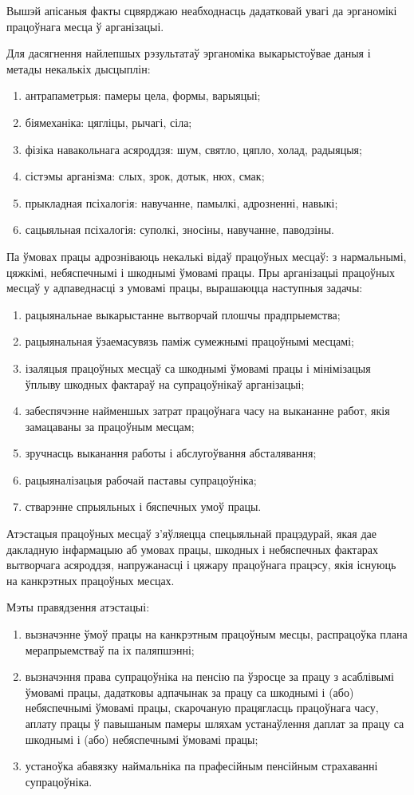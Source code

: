 Вышэй апісаныя факты сцвярджаю неабходнасць дадатковай увагі да эрганомікі
працоўнага месца ў арганізацыі.

Для дасягнення найлепшых рэзультатаў эрганоміка выкарыстоўвае даныя і метады некалькіх дысцыплін:
\begin{enumerate}
    \item антрапаметрыя: памеры цела, формы, варыяцыі;
    \item біямеханіка: цягліцы, рычагі, сіла;
    \item фізіка навакольнага асяроддзя: шум, святло, цяпло, холад, радыяцыя;
    \item сістэмы арганізма: слых, зрок, дотык, нюх, смак;
    \item прыкладная псіхалогія: навучанне, памылкі, адрозненні, навыкі;
    \item сацыяльная псіхалогія: суполкі, зносіны, навучанне, паводзіны.
\end{enumerate}

Па ўмовах працы адрозніваюць некалькі відаў працоўных месцаў: з нармальнымі, цяжкімі, небяспечнымі і шкоднымі ўмовамі працы. Пры арганізацыі працоўных месцаў у адпаведнасці з умовамі працы, вырашаюцца наступныя задачы:
\begin{enumerate}
    \item рацыянальнае выкарыстанне вытворчай плошчы прадпрыемства;
    \item рацыянальная ўзаемасувязь паміж сумежнымі працоўнымі месцамі;
    \item ізаляцыя працоўных месцаў са шкоднымі ўмовамі працы і мінімізацыя ўплыву шкодных фактараў на супрацоўнікаў арганізацыі;
    \item забеспячэнне найменшых затрат працоўнага часу на выкананне работ, якія замацаваны за працоўным месцам;
    \item зручнасць выканання работы і абслугоўвання абсталявання;
    \item рацыяналізацыя рабочай паставы супрацоўніка;
    \item стварэнне спрыяльных і бяспечных умоў працы.
\end{enumerate}

Атэстацыя працоўных месцаў з'яўляецца спецыяльнай працэдурай, якая дае дакладную інфармацыю аб умовах працы, шкодных і небяспечных фактарах вытворчага асяроддзя, напружанасці і цяжару працоўнага працэсу, якія існуюць на канкрэтных працоўных месцах.

Мэты правядзення атэстацыі:
\begin{enumerate}
    \item вызначэнне ўмоў працы на канкрэтным працоўным месцы, распрацоўка плана мерапрыемстваў па іх паляпшэнні;
    \item вызначэння права супрацоўніка на пенсію па ўзросце за працу з асаблівымі ўмовамі працы, дадатковы адпачынак за працу са шкоднымі і (або) небяспечнымі ўмовамі працы, скарочаную працягласць працоўнага часу, аплату працы ў павышаным памеры шляхам устанаўлення даплат за працу са шкоднымі і (або) небяспечнымі ўмовамі працы;
    \item устаноўка абавязку наймальніка па прафесійным пенсійным страхаванні супрацоўніка.
\end{enumerate}

